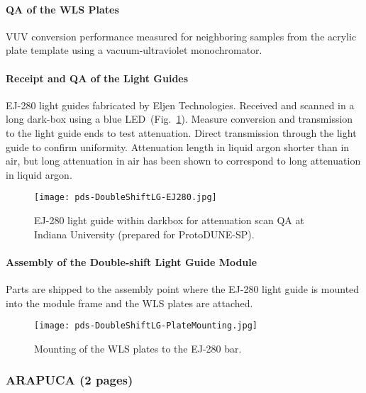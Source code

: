 \paragraph*{QA of the WLS Plates}

VUV conversion performance measured for neighboring samples from the 
acrylic plate template using a vacuum-ultraviolet monochromator.

\paragraph*{Receipt and QA of the Light Guides}

EJ-280 light guides fabricated by Eljen Technologies. Received and scanned in a 
long dark-box using a blue LED~(Fig.~\ref{fig:DoubleShiftLG-EJ280}).
 Measure conversion and transmission to the light guide ends to test attenuation. 
Direct transmission through the light guide to confirm uniformity. 
Attenuation length in liquid argon shorter than in air, but long attenuation in 
air has been shown to correspond to long attenuation in liquid argon.

\begin{figure}[ht]
  \begin{center}
  \texttt{[image: pds-DoubleShiftLG-EJ280.jpg]}
  \caption{EJ-280 light guide within darkbox for attenuation scan QA at 
Indiana University (prepared for ProtoDUNE-SP).}\label{fig:DoubleShiftLG-EJ280}
  \end{center}
\end{figure}

\paragraph*{Assembly of the Double-shift Light Guide Module}

Parts are shipped to the assembly point where the EJ-280 light guide is mounted 
into the module frame and the WLS plates are attached.

\begin{figure}[ht]
  \begin{center}
  \texttt{[image: pds-DoubleShiftLG-PlateMounting.jpg]}
  \caption{Mounting of the WLS plates to the EJ-280 bar.}\label{fig:DoubleShiftLG-PlateMounting}
  \end{center}
\end{figure}


\subsubsection{ARAPUCA (2 pages)}
\label{ssec:fdsp-pd-pc-prod-arapuca}



